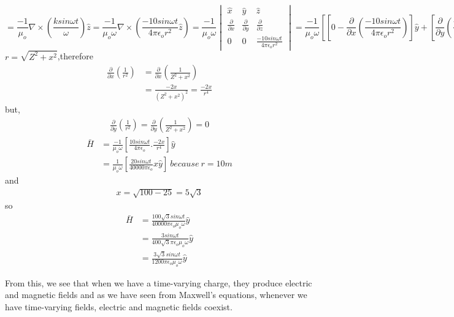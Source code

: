 \begin{exmp}
\begin{dmath*}
= \frac{-1}{\mu_o} \nabla\times\left(\frac{ksin\omega t}{\omega} \right)\hat{z}
= \frac{-1}{\mu_o\omega}\nabla\times\left(\frac{-10sin\omega t}{4\pi\epsilon_o r^2} \hat{z}\right)=\frac{-1}{\mu_o\omega}\begin{vmatrix}
\hat{x} &\hat{y} &\hat{z}\\
\frac{\partial}{\partial x} & \frac{\partial}{\partial y} & \frac{\partial}{\partial z} \\
0 &0 &\frac{-10sin\omega t}{4\pi\epsilon_o r^2}
\end{vmatrix}
= \frac{-1}{\mu_o\omega}\left[\left[  0 - \frac{\partial}{\partial x}\left( \frac{-10sin\omega t}{4\pi \epsilon_o r^2}\right)  \right]\hat{y} + \left[ \frac{\partial}{\partial y}\left(\frac{-10sin\omega t}{4 \pi\epsilon_o r^2} \right)\hat{x}\right]\right] 
\end{dmath*}
$r = \sqrt{Z^2 + x^2}$,therefore
\begin{align*}
\frac{\partial }{\partial x}\left(\frac{1}{r^2} \right) &=  \frac{\partial }{\partial x}\left(\frac{1}{Z^2 + x^2} \right)\\
&= \frac{-2x}{(Z^2 + x^2)^2} = \frac{-2x}{r^4} 
\end{align*}
but,
\begin{align*}
\frac{\partial}{\partial y}\left(\frac{1}{r^2} \right) = \frac{\partial}{\partial y}\left(\frac{1}{Z^2 + x^2} \right) = 0  
\end{align*}
\begin{align*}
\bar{H} &= \frac{-1}{\mu_o\omega}\left[ \frac{10sin\omega t}{4\pi\epsilon_o}.\frac{-2x}{r^4}\right]\hat{y} \\
&= \frac{1}{\mu_o\omega}\left[ \frac{20sin\omega t}{40000\pi\epsilon_o}x\hat{y}\right] \ because\ r = 10m 
\end{align*}
and
\begin{align*}
x = \sqrt{100 - 25} = 5\sqrt{3}
\end{align*}
so
\begin{align*}
\bar{H} &=  \frac{100\sqrt{3}sin\omega t}{40000\pi\epsilon_o\mu_o\omega}\hat{y}\\
&= \frac{3sin\omega t}{400\sqrt{3}\pi\epsilon_o\mu_o\omega}\hat{y} \\
&= \frac{3\sqrt{3}sin\omega t}{1200\pi\epsilon_o\mu_o\omega}\hat{y}
\end{align*}
\end{exmp}

From this, we see that when we have a time-varying charge, they produce electric and magnetic fields and as we have seen from Maxwell's equations, whenever we have time-varying fields, electric and magnetic fields coexist.

